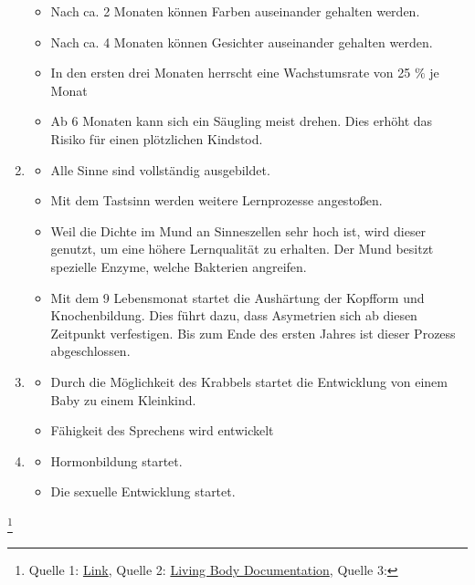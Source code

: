 \begin{enumerate}
\begin{itemize}
		\item Nach ca. 2 Monaten können Farben auseinander gehalten werden.
		\item Nach ca. 4 Monaten können Gesichter auseinander gehalten werden.
		\item In den ersten drei Monaten herrscht eine Wachstumsrate von 25 $\%$ je Monat
		\item Ab 6 Monaten kann sich ein Säugling meist drehen. Dies erhöht das Risiko für einen plötzlichen Kindstod.
	\end{itemize}
	\item[8 Monate]
	\begin{itemize}
		\item Alle Sinne sind vollständig ausgebildet.
		\item Mit dem Tastsinn werden weitere Lernprozesse angestoßen.
		\item Weil die Dichte im Mund an Sinneszellen sehr hoch ist, wird dieser genutzt, um eine höhere Lernqualität zu erhalten. Der Mund besitzt spezielle Enzyme, welche Bakterien angreifen.
		\item Mit dem 9 Lebensmonat startet die Aushärtung der Kopfform und Knochenbildung. Dies führt dazu, dass Asymetrien sich ab diesen Zeitpunkt verfestigen. Bis zum Ende des ersten Jahres ist dieser Prozess abgeschlossen.
	\end{itemize}
	\item[1 Jahr]
	\begin{itemize}
		\item Durch die Möglichkeit des Krabbels startet die Entwicklung von einem Baby zu einem Kleinkind.
		\item Fähigkeit des Sprechens wird entwickelt
	\end{itemize}
	\item[11 Jahre]
	\begin{itemize}
		\item Hormonbildung startet.
		\item Die sexuelle Entwicklung startet.
	\end{itemize}
\end{enumerate}
\footnote{
	Quelle 1: \href{https://www.ipzf.de/gehirnentwicklung.html}{Link},
	Quelle 2: \href{https://www.youtube.com/watch?v=ZNYv_ory8rc}{Living Body Documentation},
	Quelle 3: %
}

